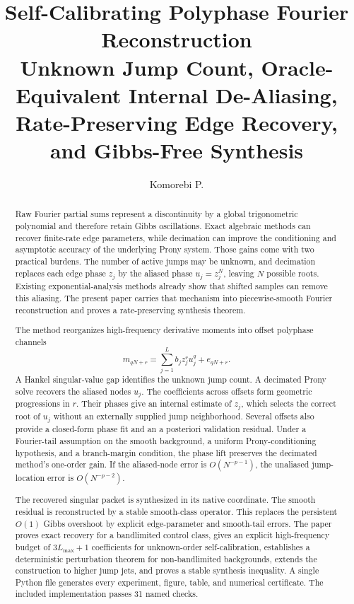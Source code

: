 \documentclass[11pt]{article}
\title{\textbf{Self-Calibrating Polyphase Fourier Reconstruction}\\[4pt]
\large Unknown Jump Count, Oracle-Equivalent Internal De-Aliasing, Rate-Preserving Edge Recovery, and Gibbs-Free Synthesis}
\author{Komorebi P.}
\date{}
\theoremstyle{remark}
\begin{document}
\maketitle

\begin{abstract}
Raw Fourier partial sums represent a discontinuity by a global trigonometric polynomial and therefore retain Gibbs oscillations. Exact algebraic methods can recover finite-rate edge parameters, while decimation can improve the conditioning and asymptotic accuracy of the underlying Prony system. Those gains come with two practical burdens. The number of active jumps may be unknown, and decimation replaces each edge phase $z_j$ by the aliased phase $u_j=z_j^N$, leaving $N$ possible roots. Existing exponential-analysis methods already show that shifted samples can remove this aliasing. The present paper carries that mechanism into piecewise-smooth Fourier reconstruction and proves a rate-preserving synthesis theorem.

The method reorganizes high-frequency derivative moments into offset polyphase channels
\[
m_{qN+r}=\sum_{j=1}^{L} b_j z_j^r u_j^q+e_{qN+r}.
\]
A Hankel singular-value gap identifies the unknown jump count. A decimated Prony solve recovers the aliased nodes $u_j$. The coefficients across offsets form geometric progressions in $r$. Their phases give an internal estimate of $z_j$, which selects the correct root of $u_j$ without an externally supplied jump neighborhood. Several offsets also provide a closed-form phase fit and an a posteriori validation residual. Under a Fourier-tail assumption on the smooth background, a uniform Prony-conditioning hypothesis, and a branch-margin condition, the phase lift preserves the decimated method's one-order gain. If the aliased-node error is $O(N^{-p-1})$, the unaliased jump-location error is $O(N^{-p-2})$.

The recovered singular packet is synthesized in its native coordinate. The smooth residual is reconstructed by a stable smooth-class operator. This replaces the persistent $O(1)$ Gibbs overshoot by explicit edge-parameter and smooth-tail errors. The paper proves exact recovery for a bandlimited control class, gives an explicit high-frequency budget of $3L_{\max}+1$ coefficients for unknown-order self-calibration, establishes a deterministic perturbation theorem for non-bandlimited backgrounds, extends the construction to higher jump jets, and proves a stable synthesis inequality. A single Python file generates every experiment, figure, table, and numerical certificate. The included implementation passes 31 named checks.
\end{abstract}
\end{document}
